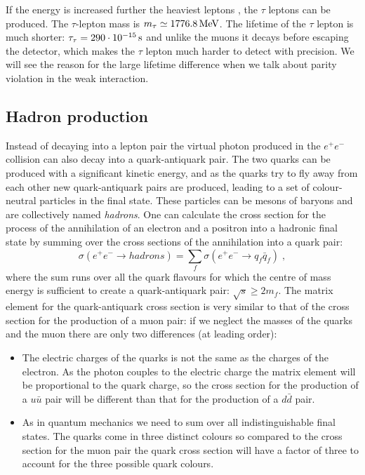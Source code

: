 \documentclass[12pt]{article}
\begin{document}
If the energy is increased further the heaviest leptons , the $\tau$ leptons can be produced. The $\tau$-lepton mass is $m_\tau\simeq1776.8\,{\rm MeV}$. The lifetime of the $\tau$ lepton is much shorter: $\tau_\tau=290\cdot 10^{-15}\,{\rm s}$ and unlike the muons it decays before escaping the detector, which makes the $\tau$ lepton much harder to detect with precision. We will see the reason for the large lifetime difference when we talk about parity violation in the weak interaction.  
\subsection{Hadron production}
Instead of decaying into a lepton pair the virtual photon produced in the $e^+e^-$ collision can also decay into a quark-antiquark pair. The two quarks can be produced with a significant kinetic energy, and as the quarks try to fly away from each other new quark-antiquark pairs are produced, leading to a set of colour-neutral particles in the final state. These particles can be mesons of baryons and are collectively named \emph{hadrons}. One can calculate the cross section for the process of the annihilation of an electron and a positron into a hadronic final state by summing over the cross sections of the annihilation into a quark pair:
\[\sigma(e^+e^-\rightarrow hadrons)=
\sum\limits_{f} \sigma(e^+e^-\rightarrow q_f\bar q_f)\;,
\] 
where the sum runs over all the quark flavours for which the centre of mass energy is sufficient to create a quark-antiquark pair: $\sqrt{s}\geq 2m_f$. The matrix element for the quark-antiquark cross section is very similar to that of the cross section for the production of a muon pair: if we neglect the masses of the quarks and the muon there are only two differences (at leading order):
\begin{itemize}
\item The electric charges of the quarks is not the same as the charges of the electron. As the photon couples to the electric charge the matrix element will be proportional to the quark charge, so the cross section for the production of a $u\bar u$ pair will be different than that for the production of a $d \bar d$ pair.
\item As in quantum mechanics we need to sum over all indistinguishable final states. The quarks come in three distinct colours so compared to the cross section for the muon pair the quark cross section will have a factor of three to account for the three possible quark colours.
\end{itemize} 
\end{document}
